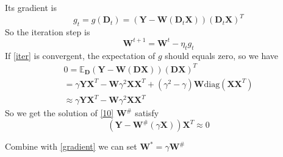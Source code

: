 Its gradient is
\begin{equation}
g_t=g(\mathbf D_t)=(\mathbf Y-\mathbf W(\mathbf D_t\mathbf X))(\mathbf D_t\mathbf X)^T
\end{equation}
So the iteration step is
\begin{equation}\label{iter}
\mathbf W^{t+1}=\mathbf W^t-\eta_t g_t
\end{equation}
If \eqref{iter} is convergent, the expectation of $g$ should equals zero, so we have
\begin{eqnarray}
0=\mathbb E_{\mathbf D}(\mathbf Y-\mathbf W(\mathbf D\mathbf X))(\mathbf D\mathbf X)^T\\
=\gamma\mathbf Y\mathbf X^T-\mathbf W \gamma^2\mathbf{X}\mathbf X^T+(\gamma^2-\gamma)\mathbf W\text{diag}(\mathbf X\mathbf X^T)\\
\approx\gamma\mathbf Y\mathbf X^T-\mathbf W \gamma^2\mathbf{X}\mathbf X^T
\end{eqnarray}
So we get the solution of \eqref{10} $\mathbf W^\#$ satisfy
\begin{equation}
(\mathbf Y-\mathbf W^\#(\gamma\mathbf X))\mathbf X^T\approx 0
\end{equation}

Combine with \eqref{gradient} we can set $\mathbf W^*=\gamma\mathbf W^\#$


